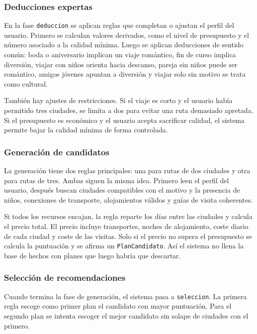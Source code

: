 \documentclass[11pt,a4paper]{article}
\begin{document}
\subsubsection{Deducciones expertas}
En la fase \texttt{deduccion} se aplican reglas que completan o ajustan el
perfil del usuario. Primero se calculan valores derivados, como el nivel de
presupuesto y el n\'umero asociado a la calidad m\'inima. Luego se aplican
deducciones de sentido com\'un: boda o aniversario implican un viaje rom\'antico,
fin de curso implica diversi\'on, viajar con ni\~nos orienta hacia descanso,
pareja sin ni\~nos puede ser rom\'antico, amigos j\'ovenes apuntan a diversi\'on y
viajar solo sin motivo se trata como cultural.

Tambi\'en hay ajustes de restricciones. Si el viaje es corto y el usuario hab\'ia
permitido tres ciudades, se limita a dos para evitar una ruta demasiado
apretada. Si el presupuesto es econ\'omico y el usuario acepta sacrificar
calidad, el sistema permite bajar la calidad m\'inima de forma controlada.

\subsubsection{Generaci\'on de candidatos}
La generaci\'on tiene dos reglas principales: una para rutas de dos ciudades y
otra para rutas de tres. Ambas siguen la misma idea. Primero leen el perfil del
usuario, despu\'es buscan ciudades compatibles con el motivo y la presencia de
ni\~nos, conexiones de transporte, alojamientos v\'alidos y gu\'ias de visita
coherentes.

Si todos los recursos encajan, la regla reparte los d\'ias entre las ciudades y
calcula el precio total. El precio incluye transportes, noches de alojamiento,
coste diario de cada ciudad y coste de las visitas. Solo si el precio no supera
el presupuesto se calcula la puntuaci\'on y se afirma un
\texttt{PlanCandidato}. As\'i el sistema no llena la base de hechos con planes
que luego habr\'ia que descartar.

\subsubsection{Selecci\'on de recomendaciones}
Cuando termina la fase de generaci\'on, el sistema pasa a \texttt{seleccion}. La
primera regla escoge como primer plan el candidato con mayor puntuaci\'on. Para
el segundo plan se intenta escoger el mejor candidato sin solape de ciudades
con el primero.
\end{document}
